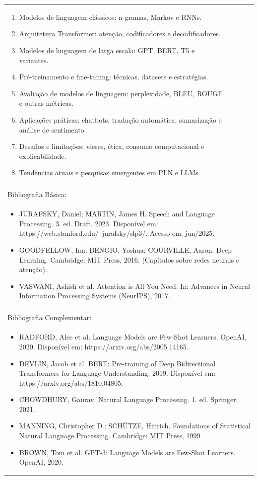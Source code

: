\documentclass[11pt]{article}
\begin{document}
\begin{center}
\begin{longtable}{|p{4cm}|p{4cm}|p{4cm}|p{4cm}|}
{\begin{enumerate}
\item Modelos de linguagem clássicos: n-gramas, Markov e RNNs.
\item Arquitetura Transformer: atenção, codificadores e decodificadores.
\item Modelos de linguagem de larga escala: GPT, BERT, T5 e variantes.
\item Pré-treinamento e fine-tuning: técnicas, datasets e estratégias.
\item Avaliação de modelos de linguagem: perplexidade, BLEU, ROUGE e outras métricas.
\item Aplicações práticas: chatbots, tradução automática, sumarização e análise de sentimento.
\item Desafios e limitações: vieses, ética, consumo computacional e explicabilidade.
\item Tendências atuais e pesquisas emergentes em PLN e LLMs.\end{enumerate}}\\
\multicolumn{4}{|p{16cm}|}{}\\
\hline
\multicolumn{4}{|p{16cm}|}{Bibliografia Básica:}\\
\multicolumn{4}{|p{16cm}|}{%
\begin{itemize}\item JURAFSKY, Daniel; MARTIN, James H. Speech and Language Processing. 3. ed. Draft. 2023. Disponível em: https://web.stanford.edu/~jurafsky/slp3/. Acesso em: jun/2025.
\item GOODFELLOW, Ian; BENGIO, Yoshua; COURVILLE, Aaron. Deep Learning. Cambridge: MIT Press, 2016. (Capítulos sobre redes neurais e atenção).
\item VASWANI, Ashish et al. Attention is All You Need. In: Advances in Neural Information Processing Systems (NeurIPS), 2017.\end{itemize}}\\
\multicolumn{4}{|p{16cm}|}{}\\
\hline
\multicolumn{4}{|p{16cm}|}{Bibliografia Complementar:}\\
\multicolumn{4}{|p{16cm}|}{%
\begin{itemize}\item RADFORD, Alec et al. Language Models are Few-Shot Learners. OpenAI, 2020. Disponível em: https://arxiv.org/abs/2005.14165.
\item DEVLIN, Jacob et al. BERT: Pre-training of Deep Bidirectional Transformers for Language Understanding. 2019. Disponível em: https://arxiv.org/abs/1810.04805.
\item CHOWDHURY, Gaurav. Natural Language Processing. 1. ed. Springer, 2021.
\item MANNING, Christopher D.; SCHÜTZE, Hinrich. Foundations of Statistical Natural Language Processing. Cambridge: MIT Press, 1999.
\item BROWN, Tom et al. GPT-3: Language Models are Few-Shot Learners. OpenAI, 2020.\end{itemize}}\\
\hline
\end{longtable}
\end{center}
\end{document}

